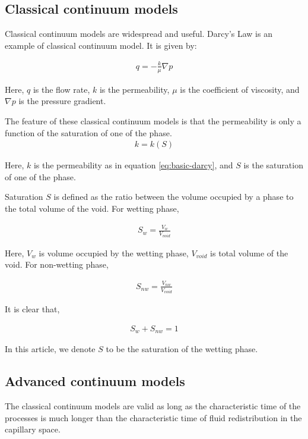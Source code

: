 \documentclass{crm-article}
\begin{document}
		\subsection{Classical continuum models}

			Classical continuum models are widespread and useful. Darcy's Law is an example of classical continuum model. It is given by:
			
			\begin{gather}
				q = -\frac{k}{\mu} \nabla p
				\label{eq:basic-darcy}
			\end{gather}
			
			Here, $q$ is the flow rate,	$k$ is the permeability, $\mu$ is the coefficient of viscosity,	and $\nabla p$ is the pressure gradient.
			
			The feature of these classical continuum models is that the permeability is only a function of the saturation of one of the phase.
			\begin{gather}
				k = k(S)
			\end{gather}
			
			Here, $k$ is the permeability as in equation \ref{eq:basic-darcy}, and $S$ is the saturation of one of the phase.

			Saturation $S$ is defined as the ratio between the volume occupied by a phase to the total volume of the void. For wetting phase,

			\begin{gather}
				S_{w} = \frac{V_{w}}{V_{void}}
			\end{gather}
			
			Here, $V_{w}$ is volume occupied by the wetting phase, $V_{void}$ is total volume of the void. For non-wetting phase,
			
			\begin{gather}
				S_{nw} = \frac{V_{nw}}{V_{void}}
			\end{gather}
			
			It is clear that,
			
			\begin{gather}
				S_{w} + S_{nw} = 1
			\end{gather}
			
			In this article, we denote $S$ to be the saturation of the wetting phase.
			
		\subsection{Advanced continuum models}
			The classical continuum models are valid as long as the characteristic time of the processes is much longer than the characteristic time of fluid redistribution in the capillary space.
			
\end{document}

